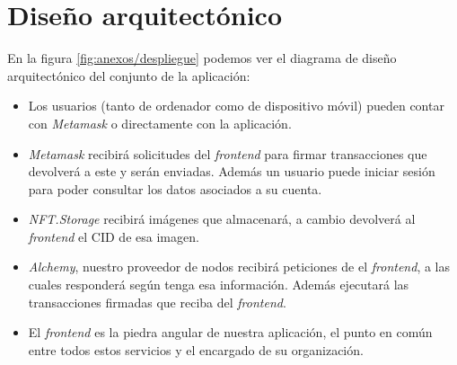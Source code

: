 \section{Diseño arquitectónico}


En la figura \ref{fig:anexos/despliegue} podemos ver el diagrama de diseño arquitectónico del conjunto de la aplicación:
\begin{itemize}
    \item Los usuarios (tanto de ordenador como de dispositivo móvil)  pueden contar con \textit{Metamask} o directamente con la aplicación.
    \item \textit{Metamask} recibirá solicitudes del \textit{frontend} para firmar transacciones que devolverá a este y serán enviadas. Además un usuario puede iniciar sesión para poder consultar los datos asociados a su cuenta.
    \item \textit{NFT.Storage} recibirá imágenes que almacenará, a cambio devolverá al \textit{frontend} el CID de esa imagen.
    \item \textit{Alchemy}, nuestro proveedor de nodos recibirá peticiones de el \textit{frontend}, a las cuales responderá según tenga esa información. Además ejecutará las transacciones firmadas que reciba del \textit{frontend}.
    \item El \textit{frontend} es la piedra angular de nuestra aplicación, el punto en común entre todos estos servicios y el encargado de su organización.
\end{itemize}

